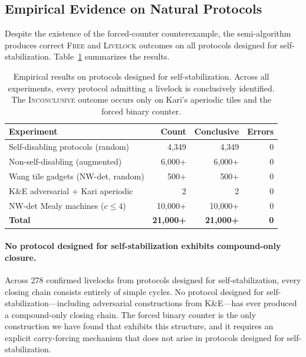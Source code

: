 \documentclass[11pt]{article}
\begin{document}
\subsection{Empirical Evidence on Natural Protocols}

Despite the existence of the forced-counter counterexample, the semi-algorithm produces correct \textsc{Free} and \textsc{Livelock} outcomes on all protocols designed for self-stabilization. Table~\ref{tab:evidence} summarizes the results.

\begin{table}[ht]
\centering
\caption{Empirical results on protocols designed for self-stabilization. Across all experiments, every protocol admitting a livelock is conclusively identified. The \textsc{Inconclusive} outcome occurs only on Kari's aperiodic tiles and the forced binary counter.}
\label{tab:evidence}
\smallskip
\begin{tabular}{lrrr}
\hline
\textbf{Experiment} & \textbf{Count} & \textbf{Conclusive} & \textbf{Errors} \\
\hline
Self-disabling protocols (random) & 4{,}349 & 4{,}349 & 0 \\
Non-self-disabling (augmented) & 6{,}000+ & 6{,}000+ & 0 \\
Wang tile gadgets (NW-det, random) & 500+ & 500+ & 0 \\
K\&E adversarial + Kari aperiodic & 2 & 2 & 0 \\
NW-det Mealy machines ($c \leq 4$) & 10{,}000+ & 10{,}000+ & 0 \\
\hline
\textbf{Total} & \textbf{21{,}000+} & \textbf{21{,}000+} & \textbf{0} \\
\hline
\end{tabular}
\end{table}

\paragraph{No protocol designed for self-stabilization exhibits compound-only closure.} Across 278 confirmed livelocks from protocols designed for self-stabilization, every closing chain consists entirely of simple cycles. No protocol designed for self-stabilization---including adversarial constructions from K\&E---has ever produced a compound-only closing chain. The forced binary counter is the only construction we have found that exhibits this structure, and it requires an explicit carry-forcing mechanism that does not arise in protocols designed for self-stabilization.
\end{document}
